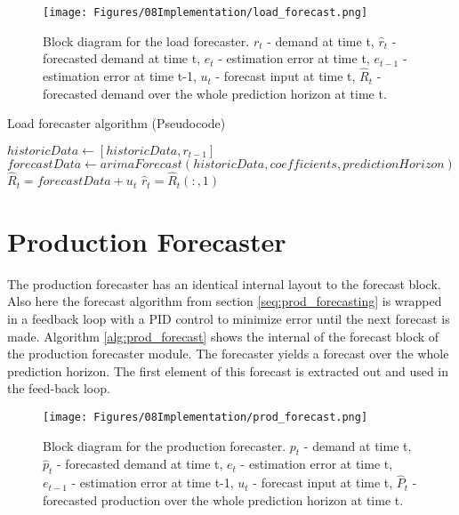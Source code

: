 \begin{figure}
    \centering
    \texttt{[image: Figures/08Implementation/load\_forecast.png]}
    \caption[Load forecaster block diagram]{Block diagram for the load forecaster. $r_t$ - demand at time t, $\hat{r}_t$ - forecasted demand at time t, $e_t$ - estimation error at time t, $e_{t-1}$ - estimation error at time t-1, $u_t$ - forecast input at time t, $\hat{R}_t$ - forecasted demand over the whole prediction horizon at time t.}
    \label{fig:load_forecaster_block}
\end{figure}

\begin{algorithm}
\caption{Load forecaster algorithm (Pseudocode)}\label{alg:load_forecast}
\begin{algorithmic}

  
    \State$historicData \gets [historicData,r_{t-1}]$
    \State$forecastData \gets arimaForecast(historicData,coefficients,predictionHorizon)$
\EndIf\\
    \State$\hat{R}_t = forecastData + u_t $
    \State$\hat{r}_t = \hat{R}_t(:,1)$  
\end{algorithmic}
\end{algorithm}

\section{Production Forecaster}
The production forecaster has an identical internal layout to the forecast block. Also here the forecast algorithm from section \ref{seq:prod_forecasting} is wrapped in a feedback loop with a PID control to minimize error until the next forecast is made. Algorithm \ref{alg:prod_forecast} shows the internal of the forecast block of the production forecaster module. The forecaster yields a forecast over the whole prediction horizon. The first element of this forecast is extracted out and used in the feed-back loop.

\begin{figure}
    \centering
    \texttt{[image: Figures/08Implementation/prod\_forecast.png]}
    \caption[Production forecaster block diagram]{Block diagram for the production forecaster. $p_t$ - demand at time t, $\hat{p}_t$ - forecasted demand at time t, $e_t$ - estimation error at time t, $e_{t-1}$ - estimation error at time t-1, $u_t$ - forecast input at time t, $\hat{P}_t$ - forecasted production over the whole prediction horizon at time t.}
    \label{fig:prod_forecaster_block}
\end{figure}

